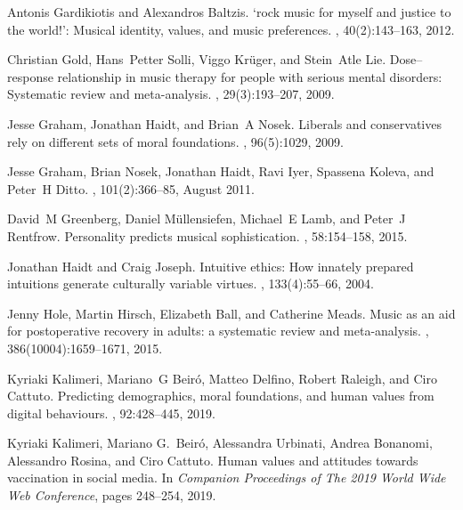 \documentclass{article}
\begin{document}
\begin{thebibliography}{10}
Antonis Gardikiotis and Alexandros Baltzis.
\newblock `rock music for myself and justice to the world!': Musical identity,
  values, and music preferences.
, 40(2):143--163, 2012.

Christian Gold, Hans~Petter Solli, Viggo Kr{\"u}ger, and Stein~Atle Lie.
\newblock Dose--response relationship in music therapy for people with serious
  mental disorders: Systematic review and meta-analysis.
, 29(3):193--207, 2009.

Jesse Graham, Jonathan Haidt, and Brian~A Nosek.
\newblock Liberals and conservatives rely on different sets of moral
  foundations.
, 96(5):1029, 2009.

Jesse Graham, Brian Nosek, Jonathan Haidt, Ravi Iyer, Spassena Koleva, and
  Peter~H Ditto.
, 101(2):366--85,
  August 2011.

David~M Greenberg, Daniel M{\"u}llensiefen, Michael~E Lamb, and Peter~J
  Rentfrow.
\newblock Personality predicts musical sophistication.
, 58:154--158, 2015.

Jonathan Haidt and Craig Joseph.
\newblock Intuitive ethics: How innately prepared intuitions generate
  culturally variable virtues.
, 133(4):55--66, 2004.

Jenny Hole, Martin Hirsch, Elizabeth Ball, and Catherine Meads.
\newblock Music as an aid for postoperative recovery in adults: a systematic
  review and meta-analysis.
, 386(10004):1659--1671, 2015.

Kyriaki Kalimeri, Mariano~G Beir{\'o}, Matteo Delfino, Robert Raleigh, and Ciro
  Cattuto.
\newblock Predicting demographics, moral foundations, and human values from
  digital behaviours.
, 92:428--445, 2019.

Kyriaki Kalimeri, Mariano G.~Beir{\'o}, Alessandra Urbinati, Andrea Bonanomi,
  Alessandro Rosina, and Ciro Cattuto.
\newblock Human values and attitudes towards vaccination in social media.
\newblock In {\em Companion Proceedings of The 2019 World Wide Web Conference},
  pages 248--254, 2019.


\end{thebibliography}
\end{document}
